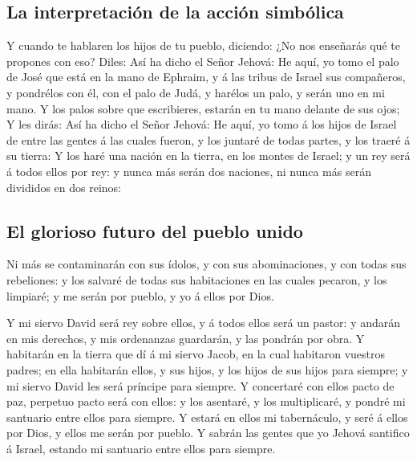 \hypertarget{la-interpretaciuxf3n-de-la-acciuxf3n-simbuxf3lica}{%
\subsection{La interpretación de la acción
simbólica}\label{la-interpretaciuxf3n-de-la-acciuxf3n-simbuxf3lica}}

 Y cuando te hablaren los hijos de tu pueblo, diciendo:
¿No nos enseñarás qué te propones con eso?  Diles: Así ha
dicho el Señor Jehová: He aquí, yo tomo el palo de José que está en la
mano de Ephraim, y á las tribus de Israel sus compañeros, y pondrélos
con él, con el palo de Judá, y harélos un palo, y serán uno en mi mano.
 Y los palos sobre que escribieres, estarán en tu mano
delante de sus ojos;  Y les dirás: Así ha dicho el Señor
Jehová: He aquí, yo tomo á los hijos de Israel de entre las gentes á las
cuales fueron, y los juntaré de todas partes, y los traeré á su tierra:
 Y los haré una nación en la tierra, en los montes de
Israel; y un rey será á todos ellos por rey: y nunca más serán dos
naciones, ni nunca más serán divididos en dos reinos:

\hypertarget{el-glorioso-futuro-del-pueblo-unido}{%
\subsection{El glorioso futuro del pueblo
unido}\label{el-glorioso-futuro-del-pueblo-unido}}

 Ni más se contaminarán con sus ídolos, y con sus
abominaciones, y con todas sus rebeliones: y los salvaré de todas sus
habitaciones en las cuales pecaron, y los limpiaré; y me serán por
pueblo, y yo á ellos por Dios.

 Y mi siervo David será rey sobre ellos, y á todos ellos
será un pastor: y andarán en mis derechos, y mis ordenanzas guardarán, y
las pondrán por obra.  Y habitarán en la tierra que dí á
mi siervo Jacob, en la cual habitaron vuestros padres; en ella habitarán
ellos, y sus hijos, y los hijos de sus hijos para siempre; y mi siervo
David les será príncipe para siempre.  Y concertaré con
ellos pacto de paz, perpetuo pacto será con ellos: y los asentaré, y los
multiplicaré, y pondré mi santuario entre ellos para siempre.
 Y estará en ellos mi tabernáculo, y seré á ellos por
Dios, y ellos me serán por pueblo.  Y sabrán las gentes
que yo Jehová santifico á Israel, estando mi santuario entre ellos para
siempre.

